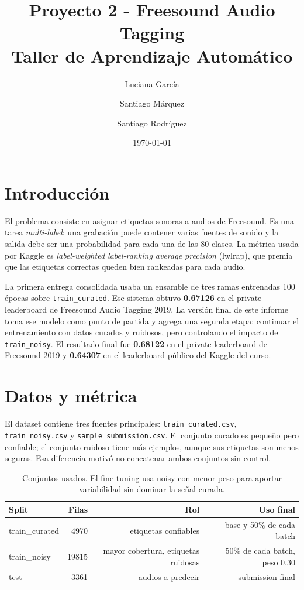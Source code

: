 \documentclass[10pt]{article}
\title{\textbf{Proyecto 2 - Freesound Audio Tagging}\\Taller de Aprendizaje Automático}
\author{Luciana García \and Santiago Márquez \and Santiago Rodríguez}
\date{\today}
\begin{document}
\maketitle

\section{Introducción}
El problema consiste en asignar etiquetas sonoras a audios de Freesound. Es una
tarea \textit{multi-label}: una grabación puede contener varias fuentes de sonido
y la salida debe ser una probabilidad para cada una de las 80 clases. La métrica
usada por Kaggle es \textit{label-weighted label-ranking average precision}
(lwlrap), que premia que las etiquetas correctas queden bien rankeadas para
cada audio.

La primera entrega consolidada usaba un ensamble de tres ramas entrenadas 100
épocas sobre \texttt{train\_curated}. Ese sistema obtuvo \textbf{0.67126} en el
private leaderboard de Freesound Audio Tagging 2019. La versión final de este
informe toma ese modelo como punto de partida y agrega una segunda etapa:
continuar el entrenamiento con datos curados y ruidosos, pero controlando el
impacto de \texttt{train\_noisy}. El resultado final fue \textbf{0.68122} en el
private leaderboard de Freesound 2019 y \textbf{0.64307} en el leaderboard
público del Kaggle del curso.

\section{Datos y métrica}
El dataset contiene tres fuentes principales: \texttt{train\_curated.csv},
\texttt{train\_noisy.csv} y \texttt{sample\_submission.csv}. El conjunto curado
es pequeño pero confiable; el conjunto ruidoso tiene más ejemplos, aunque sus
etiquetas son menos seguras. Esa diferencia motivó no concatenar ambos conjuntos
sin control.

\begin{table}[H]
\centering
\small
\begin{tabular}{@{}lrrr@{}}
\toprule
Split & Filas & Rol & Uso final \\
\midrule
train\_curated & 4970 & etiquetas confiables & base y 50\% de cada batch \\
train\_noisy & 19815 & mayor cobertura, etiquetas ruidosas & 50\% de cada batch, peso 0.30 \\
test & 3361 & audios a predecir & submission final \\
\bottomrule
\end{tabular}
\caption{Conjuntos usados. El fine-tuning usa noisy con menor peso para aportar
variabilidad sin dominar la señal curada.}
\end{table}
\end{document}
